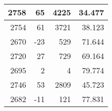 \begin{longtable}{|r|r|r|r|}
		2758                                                                                               & 65                                                     & 4225                                                            & 34.477                                                                                                               \\ \hline
		2754                                                                                               & 61                                                     & 3721                                                            & 38.123                                                                                                               \\ \hline
		2670                                                                                               & -23                                                    & 529                                                             & 71.644                                                                                                               \\ \hline
		2720                                                                                               & 27                                                     & 729                                                             & 69.164                                                                                                               \\ \hline
		2695                                                                                               & 2                                                      & 4                                                               & 79.774                                                                                                               \\ \hline
		2746                                                                                               & 53                                                     & 2809                                                            & 45.723                                                                                                               \\ \hline
		2682                                                                                               & -11                                                    & 121                                                             & 77.831                                                                                                               \\ \hline

\end{longtable}
